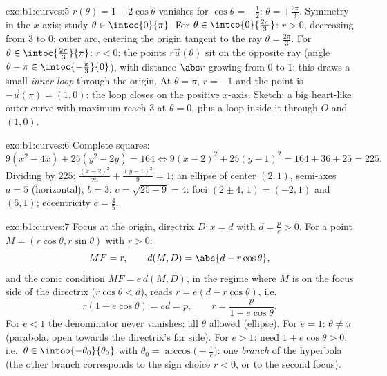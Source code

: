 \begin{solution}{exo:b1:curves:5}
$r(\theta) = 1 + 2\cos\theta$ vanishes for $\cos\theta = -\frac12$:
$\theta = \pm\frac{2\pi}{3}$. Symmetry in the $x$-axis; study
$\theta \in \intcc{0}{\pi}$. For $\theta \in
\intco{0}{\frac{2\pi}{3}}$: $r > 0$, decreasing from $3$ to $0$:
outer arc, entering the origin tangent to the ray $\theta =
\frac{2\pi}{3}$. For $\theta \in \intoc{\frac{2\pi}{3}}{\pi}$: $r <
0$: the points $r\vec u(\theta)$ sit on the opposite ray (angle
$\theta - \pi \in \intoc{-\frac\pi3}{0}$), with distance $\abs r$
growing from $0$ to $1$: this draws a small \emph{inner loop}
through the origin. At $\theta = \pi$, $r = -1$ and the point is
$-\vec u(\pi) = (1, 0)$: the loop closes on the positive $x$-axis.
Sketch: a big heart-like outer curve
with maximum reach $3$ at $\theta = 0$, plus a loop inside it
through $O$ and $(1,0)$.
\end{solution}

\begin{solution}{exo:b1:curves:6}
Complete squares:
\[
9(x^2 - 4x) + 25(y^2 - 2y) = 164
\iff 9(x-2)^2 + 25(y-1)^2 = 164 + 36 + 25 = 225 .
\]
Dividing by $225$: $\frac{(x-2)^2}{25} + \frac{(y-1)^2}{9} = 1$: an
ellipse of center $(2, 1)$, semi-axes $a = 5$ (horizontal), $b =
3$; $c = \sqrt{25 - 9} = 4$: foci $(2 \pm 4,\, 1) = (-2, 1)$ and
$(6, 1)$; eccentricity $e = \frac45$.
\end{solution}

\begin{solution}{exo:b1:curves:7}
Focus at the origin, directrix $D: x = d$ with $d = \frac pe > 0$.
For a point $M = (r\cos\theta, r\sin\theta)$ with $r > 0$:
\[
MF = r,
\qquad
d(M, D) = \abs{d - r\cos\theta},
\]
and the conic condition $MF = e\,d(M, D)$, in the regime where $M$
is on the focus side of the directrix ($r\cos\theta < d$), reads $r
= e(d - r\cos\theta)$, i.e.
\[
r(1 + e\cos\theta) = ed = p,
\qquad
r = \frac{p}{1 + e\cos\theta} .
\]
For $e < 1$ the denominator never vanishes: all $\theta$ allowed
(ellipse). For $e = 1$: $\theta \neq \pi$ (parabola, open towards
the directrix's far side). For $e > 1$: need $1 + e\cos\theta > 0$,
i.e.\ $\theta \in \intoo{-\theta_0}{\theta_0}$ with $\theta_0 =
\arccos\bigl(-\frac1e\bigr)$: one \emph{branch} of the hyperbola
(the other branch corresponds to the sign choice $r < 0$, or to the
second focus).
\end{solution}

